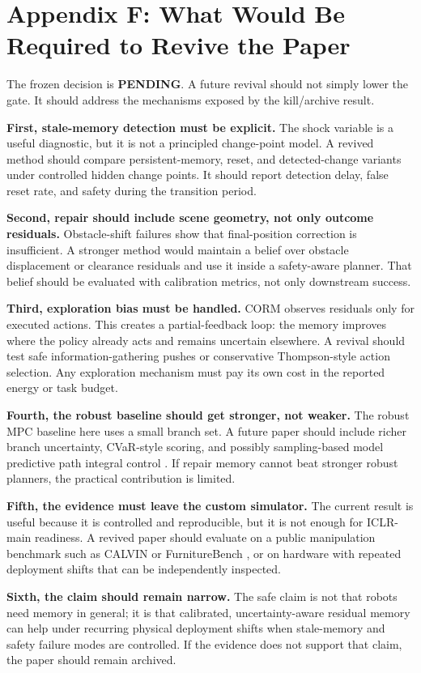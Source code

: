 \documentclass{article}
\newcommand{\TerminalDecision}{PENDING}
\begin{document}
\section*{Appendix F: What Would Be Required to Revive the Paper}

The frozen decision is \textbf{\TerminalDecision}. A future revival should not simply lower the gate. It should address the mechanisms exposed by the kill/archive result.

\textbf{First, stale-memory detection must be explicit.} The shock variable is a useful diagnostic, but it is not a principled change-point model. A revived method should compare persistent-memory, reset, and detected-change variants under controlled hidden change points. It should report detection delay, false reset rate, and safety during the transition period.

\textbf{Second, repair should include scene geometry, not only outcome residuals.} Obstacle-shift failures show that final-position correction is insufficient. A stronger method would maintain a belief over obstacle displacement or clearance residuals and use it inside a safety-aware planner. That belief should be evaluated with calibration metrics, not only downstream success.

\textbf{Third, exploration bias must be handled.} CORM observes residuals only for executed actions. This creates a partial-feedback loop: the memory improves where the policy already acts and remains uncertain elsewhere. A revival should test safe information-gathering pushes or conservative Thompson-style action selection. Any exploration mechanism must pay its own cost in the reported energy or task budget.

\textbf{Fourth, the robust baseline should get stronger, not weaker.} The robust MPC baseline here uses a small branch set. A future paper should include richer branch uncertainty, CVaR-style scoring, and possibly sampling-based model predictive path integral control \citep{williams2017mppi}. If repair memory cannot beat stronger robust planners, the practical contribution is limited.

\textbf{Fifth, the evidence must leave the custom simulator.} The current result is useful because it is controlled and reproducible, but it is not enough for ICLR-main readiness. A revived paper should evaluate on a public manipulation benchmark such as CALVIN or FurnitureBench \citep{mees2022calvin,heo2025furniturebench}, or on hardware with repeated deployment shifts that can be independently inspected.

\textbf{Sixth, the claim should remain narrow.} The safe claim is not that robots need memory in general; it is that calibrated, uncertainty-aware residual memory can help under recurring physical deployment shifts when stale-memory and safety failure modes are controlled. If the evidence does not support that claim, the paper should remain archived.



\end{document}
